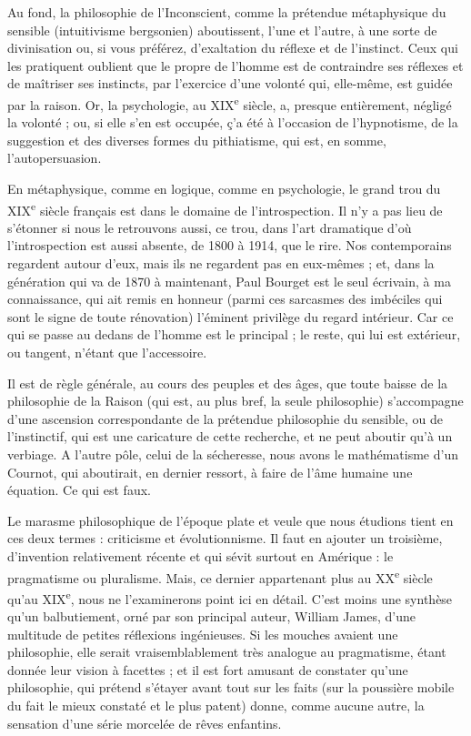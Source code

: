 \documentclass[french,twoside]{book} %
\begin{document}
Au fond, la philosophie de l’Inconscient, comme la prétendue métaphysique du sensible (intuitivisme bergsonien) aboutissent, l’une et l’autre, à une sorte de divinisation ou, si vous préférez, d’exaltation du réflexe et de l’instinct. Ceux qui les pratiquent oublient que le propre de l’homme est de contraindre ses réflexes et de maîtriser ses instincts, par l’exercice d’une volonté qui, elle-même, est guidée par la raison. Or, la psychologie, au XIX\textsuperscript{e} siècle, a, presque entièrement, négligé la volonté ; ou, si elle s’en est occupée, ç’a été à l’occasion de l’hypnotisme, de la suggestion et des diverses formes du pithiatisme, qui est, en somme, l’autopersuasion.\par
En métaphysique, comme en logique, comme en psychologie, le grand trou du XIX\textsuperscript{e} siècle français est dans le domaine de l’introspection. Il n’y a pas lieu de s’étonner si nous le retrouvons aussi, ce trou, dans l’art dramatique d’où l’introspection est aussi absente, de 1800 à 1914, que le rire. Nos contemporains regardent autour d’eux, mais ils ne regardent pas en eux-mêmes ; et, dans la génération qui va de 1870 à maintenant, Paul Bourget est le seul écrivain, à ma connaissance, qui ait remis en honneur (parmi ces sarcasmes des imbéciles qui sont le signe de toute rénovation) l’éminent privilège du regard intérieur. Car ce qui se passe au dedans de l’homme est le principal ; le reste, qui lui est extérieur, ou tangent, n’étant que l’accessoire.\par
Il est de règle générale, au cours des peuples et des âges, que toute baisse de la philosophie de la Raison (qui est, au plus bref, la seule philosophie) s’accompagne d’une ascension correspondante de la prétendue philosophie du sensible, ou de l’instinctif, qui est une caricature de cette recherche, et ne peut aboutir qu’à un verbiage. A l’autre pôle, celui de la sécheresse, nous avons le mathématisme d’un Cournot, qui aboutirait, en dernier ressort, à faire de l’âme humaine une équation. Ce qui est faux.\par
Le marasme philosophique de l’époque plate et veule que nous étudions tient en ces deux termes : criticisme et évolutionnisme. Il faut en ajouter un troisième, d’invention relativement récente et qui sévit surtout en Amérique : le pragmatisme ou pluralisme. Mais, ce dernier appartenant plus au XX\textsuperscript{e} siècle qu’au XIX\textsuperscript{e}, nous ne l’examinerons point ici en détail. C’est moins une synthèse qu’un balbutiement, orné par son principal auteur, William James, d’une multitude de petites réflexions ingénieuses. Si les mouches avaient une philosophie, elle serait vraisemblablement très analogue au pragmatisme, étant donnée leur vision à facettes ; et il est fort amusant de constater qu’une philosophie, qui prétend s’étayer avant tout sur les faits (sur la poussière mobile du fait le mieux constaté et le plus patent) donne, comme aucune autre, la sensation d’une série morcelée de rêves enfantins.\par
\end{document}
